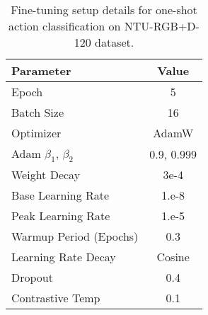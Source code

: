 \begin{table}[h]
    \centering
    \caption{Fine-tuning setup details for one-shot action classification on NTU-RGB+D-120 \cite{ntu120paper} dataset.} 
    \begin{tabular}{l c}
        \toprule
        \toprule
        \textbf{Parameter}            & \textbf{Value}                \\ \hline
        Epoch                         & 5                            \\ 
        Batch Size                    & 16                             \\ 
        Optimizer                     & AdamW                         \\ 
        Adam \(\beta_1\), \(\beta_2\) & 0.9, 0.999                    \\ 
        Weight Decay                  & 3e-4                          \\ 
        Base Learning Rate             & 1.e-8                        \\ 
        Peak Learning Rate             & 1.e-5                        \\ 
        Warmup Period (Epochs)        & 0.3                       \\ 
        Learning Rate Decay           & Cosine                        \\ 
        Dropout                       & 0.4                           \\ 
        Contrastive Temp              & 0.1                            \\ \bottomrule
    \end{tabular}
    \label{tab:dt2_training_setup}
\end{table}